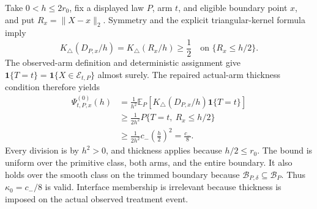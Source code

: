 Take \(0<h\leq2r_0\), fix a displayed law \(P\), arm \(t\), and eligible boundary point \(x\), and put \(R_x=\lVert X-x\rVert_2\).  Symmetry and the explicit triangular-kernel formula imply
\[
 K_\triangle(D_{P,x}/h)=K_\triangle(R_x/h)\geq\frac12
 \quad\text{on }\{R_x\leq h/2\}.
\]
The observed-arm definition and deterministic assignment give \(\mathbf1\{T=t\}=\mathbf1\{X\in\mathcal E_{t,P}\}\) almost surely.  The repaired actual-arm thickness condition therefore yields
\[
\begin{aligned}
 \Psi^{(0)}_{t,P,x}(h)
 &=\frac1{h^2}\mathbb E_P\!\left[
 K_\triangle(D_{P,x}/h)\mathbf1\{T=t\}\right]\\
 &\geq\frac1{2h^2}P\{T=t,\ R_x\leq h/2\}\\
 &\geq\frac1{2h^2}c_-\left(\frac h2\right)^2
 =\frac{c_-}{8}.
\end{aligned}
\]
Every division is by \(h^2>0\), and thickness applies because \(h/2\leq r_0\).  The bound is uniform over the primitive class, both arms, and the entire boundary.  It also holds over the smooth class on the trimmed boundary because \(\mathcal B_{P,\delta}\subseteq\mathcal B_P\).  Thus \(\kappa_0=c_-/8\) is valid.  Interface membership is irrelevant because thickness is imposed on the actual observed treatment event.